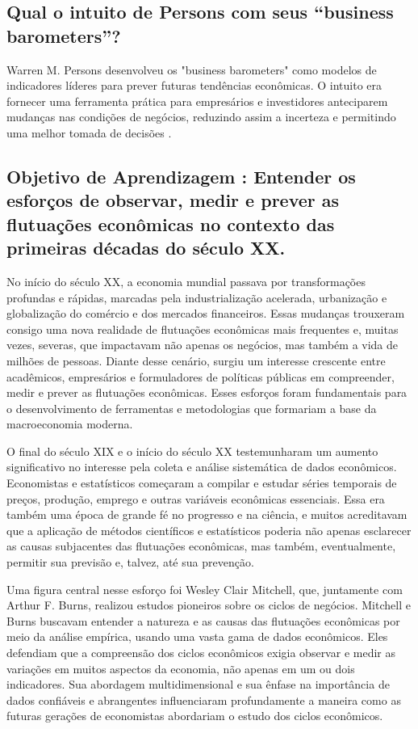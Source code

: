 \documentclass[a4paper,12pt]{article}[abntex2]
\begin{document}
\subsection{\textbf{Qual o intuito de Persons com seus “business barometers”?}}
Warren M. Persons desenvolveu os "business barometers" como modelos de indicadores líderes para prever futuras tendências econômicas. O intuito era fornecer uma ferramenta prática para empresários e investidores anteciparem mudanças nas condições de negócios, reduzindo assim a incerteza e permitindo uma melhor tomada de decisões .
\subsection{\textbf{Objetivo de Aprendizagem : Entender os esforços de observar, medir e prever as flutuações econômicas no contexto das primeiras décadas do século XX.}}
No início do século XX, a economia mundial passava por transformações profundas e rápidas, marcadas pela industrialização acelerada, urbanização e globalização do comércio e dos mercados financeiros. Essas mudanças trouxeram consigo uma nova realidade de flutuações econômicas mais frequentes e, muitas vezes, severas, que impactavam não apenas os negócios, mas também a vida de milhões de pessoas. Diante desse cenário, surgiu um interesse crescente entre acadêmicos, empresários e formuladores de políticas públicas em compreender, medir e prever as flutuações econômicas. Esses esforços foram fundamentais para o desenvolvimento de ferramentas e metodologias que formariam a base da macroeconomia moderna.

O final do século XIX e o início do século XX testemunharam um aumento significativo no interesse pela coleta e análise sistemática de dados econômicos. Economistas e estatísticos começaram a compilar e estudar séries temporais de preços, produção, emprego e outras variáveis econômicas essenciais. Essa era também uma época de grande fé no progresso e na ciência, e muitos acreditavam que a aplicação de métodos científicos e estatísticos poderia não apenas esclarecer as causas subjacentes das flutuações econômicas, mas também, eventualmente, permitir sua previsão e, talvez, até sua prevenção.

Uma figura central nesse esforço foi Wesley Clair Mitchell, que, juntamente com Arthur F. Burns, realizou estudos pioneiros sobre os ciclos de negócios. Mitchell e Burns buscavam entender a natureza e as causas das flutuações econômicas por meio da análise empírica, usando uma vasta gama de dados econômicos. Eles defendiam que a compreensão dos ciclos econômicos exigia observar e medir as variações em muitos aspectos da economia, não apenas em um ou dois indicadores. Sua abordagem multidimensional e sua ênfase na importância de dados confiáveis e abrangentes influenciaram profundamente a maneira como as futuras gerações de economistas abordariam o estudo dos ciclos econômicos.
\end{document}
